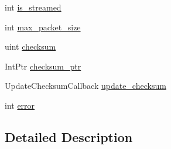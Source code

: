 \begin{DoxyCompactItemize}
\item 
int \hyperlink{class_tao_1_1_f_fmpeg_1_1_f_fmpeg_1_1_byte_i_o_context_ae0e1494e27e55c1ac8655d6bdf428462}{is\_\-streamed}
\item 
int \hyperlink{class_tao_1_1_f_fmpeg_1_1_f_fmpeg_1_1_byte_i_o_context_a7782e3659628e7f4a51520cfa0f1a3f2}{max\_\-packet\_\-size}
\item 
uint \hyperlink{class_tao_1_1_f_fmpeg_1_1_f_fmpeg_1_1_byte_i_o_context_a542fb926d2c980dcf9e37c77a898f73b}{checksum}
\item 
IntPtr \hyperlink{class_tao_1_1_f_fmpeg_1_1_f_fmpeg_1_1_byte_i_o_context_a23c480e7f00a0e12579cf90836be4e15}{checksum\_\-ptr}
\item 
UpdateChecksumCallback \hyperlink{class_tao_1_1_f_fmpeg_1_1_f_fmpeg_1_1_byte_i_o_context_a82a818f0432ea41a85b7e990fc2a91fb}{update\_\-checksum}
\item 
int \hyperlink{class_tao_1_1_f_fmpeg_1_1_f_fmpeg_1_1_byte_i_o_context_a13daa2f893e00fd2d399ed7c4efbeab3}{error}
\end{DoxyCompactItemize}


\subsection{Detailed Description}



